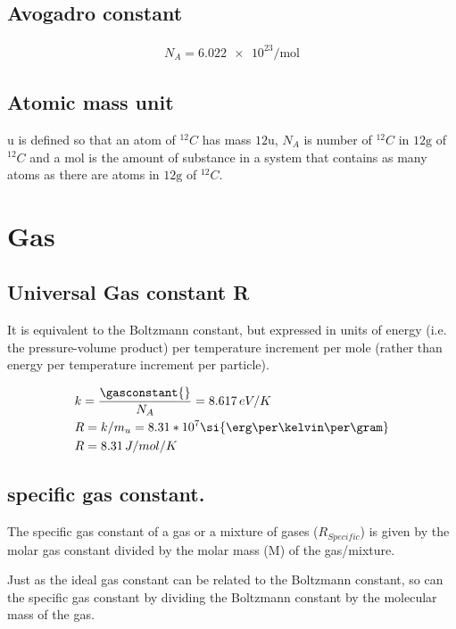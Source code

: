 \documentclass[oneside,12pt,fleqn]{memoir}
\begin{document}
\subsection{Avogadro constant}
\begin{align*}
N_A=\num{6.022e23}\si{\per\mole}
\end{align*}

\subsection{Atomic mass unit}

\si{\atomicmassunit} is defined so that an atom of $^{12}C$ has mass $12 \si{\atomicmassunit}$, $N_A$ is number of $^{12}C$ in $12 \si{\gram}$ of $^{12}C$ and a \si{\mole} is the amount of substance in a system that contains as many atoms as there are atoms in $12\si{\gram}$ of $^{12}C$.



\section{Gas}

\subsection{Universal Gas constant R}

It is equivalent to the Boltzmann constant, but expressed in units of energy (i.e. the pressure-volume product) per temperature increment per mole (rather than energy per temperature increment per particle).

\begin{align*}
&k=\frac{\gasconstant{}}{N_A}=8.617\,eV/K\\
&R=k/m_u=8.31*10^7 \si{\erg\per\kelvin\per\gram}\\
&R=8.31\,J/mol/K
\end{align*}

\subsection{specific gas constant.}

The specific gas constant of a gas or a mixture of gases ($R_{Specific}$) is given by the molar gas constant divided by the molar mass (M) of the gas/mixture.

Just as the ideal gas constant can be related to the Boltzmann constant, so can the specific gas constant by dividing the Boltzmann constant by the molecular mass of the gas.
\end{document}
